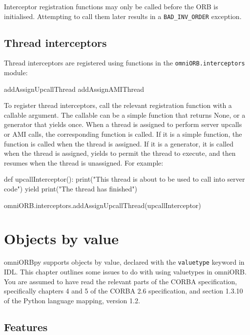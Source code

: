\documentclass[11pt,oneside,a4paper]{book}
\newcommand{\code}[1]{\texttt{#1}}
\begin{document}
Interceptor registration functions may only be called before the ORB
is initialised. Attempting to call them later results in a
\code{BAD\_INV\_ORDER} exception.


\section{Thread interceptors}

Thread interceptors are registered using functions in the
\code{omniORB.interceptors} module:

\begin{pylisting}
  addAssignUpcallThread
  addAssignAMIThread
\end{pylisting}

To register thread interceptors, call the relevant registration
function with a callable argument. The callable can be a simple
function that returns None, or a generator that yields once. When a
thread is assigned to perform server upcalls or AMI calls, the
corresponding function is called. If it is a simple function, the
function is called when the thread is assigned. If it is a generator,
it is called when the thread is assigned, yields to permit the thread
to execute, and then resumes when the thread is unassigned. For
example:

\begin{pylisting}
def upcallInterceptor():
    print("This thread is about to be used to call into server code")
    yield
    print("The thread has finished")

omniORB.interceptors.addAssignUpcallThread(upcallInterceptor)
\end{pylisting}



\chapter{Objects by value}
\label{chap:valuetype}

omniORBpy supports objects by value, declared with the
\code{valuetype} keyword in IDL. This chapter outlines some issues to
do with using valuetypes in omniORB. You are assumed to have read the
relevant parts of the CORBA specification, specifically chapters 4 and
5 of the CORBA 2.6 specification, and section 1.3.10 of the Python
language mapping, version 1.2.


\section{Features}
\end{document}
